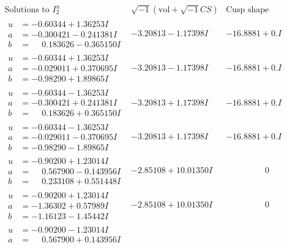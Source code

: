 \documentclass[1p]{elsarticle_modified}
\theoremstyle{definition}
\newcommand{\I}{\sqrt{-1}}
\begin{document}
$$\begin{array}{c|c|c}
\text{Solutions to }I^u_{2}& \I (\text{vol} + \sqrt{-1}CS) & \text{Cusp shape}\\
 \hline 
\begin{aligned}
u &= -0.60344 + 1.36253 I \\
a &= -0.300421 - 0.241381 I \\
b &= \phantom{-}0.183626 - 0.365150 I\end{aligned}
 & -3.20813 - 1.17398 I & -16.8881 + 0. I\phantom{ +0.000000I} \\ \hline\begin{aligned}
u &= -0.60344 + 1.36253 I \\
a &= -0.029011 + 0.370695 I \\
b &= -0.98290 + 1.89865 I\end{aligned}
 & -3.20813 - 1.17398 I & -16.8881 + 0. I\phantom{ +0.000000I} \\ \hline\begin{aligned}
u &= -0.60344 - 1.36253 I \\
a &= -0.300421 + 0.241381 I \\
b &= \phantom{-}0.183626 + 0.365150 I\end{aligned}
 & -3.20813 + 1.17398 I & -16.8881 + 0. I\phantom{ +0.000000I} \\ \hline\begin{aligned}
u &= -0.60344 - 1.36253 I \\
a &= -0.029011 - 0.370695 I \\
b &= -0.98290 - 1.89865 I\end{aligned}
 & -3.20813 + 1.17398 I & -16.8881 + 0. I\phantom{ +0.000000I} \\ \hline\begin{aligned}
u &= -0.90200 + 1.23014 I \\
a &= \phantom{-}0.567900 - 0.143956 I \\
b &= \phantom{-}0.233108 + 0.551448 I\end{aligned}
 & -2.85108 + 10.01350 I & \phantom{-0.000000 } 0 \\ \hline\begin{aligned}
u &= -0.90200 + 1.23014 I \\
a &= -1.36302 + 0.57989 I \\
b &= -1.16123 - 1.45442 I\end{aligned}
 & -2.85108 + 10.01350 I & \phantom{-0.000000 } 0 \\ \hline\begin{aligned}
u &= -0.90200 - 1.23014 I \\
a &= \phantom{-}0.567900 + 0.143956 I \\

\end{aligned}
\end{array}$$
\end{document}
